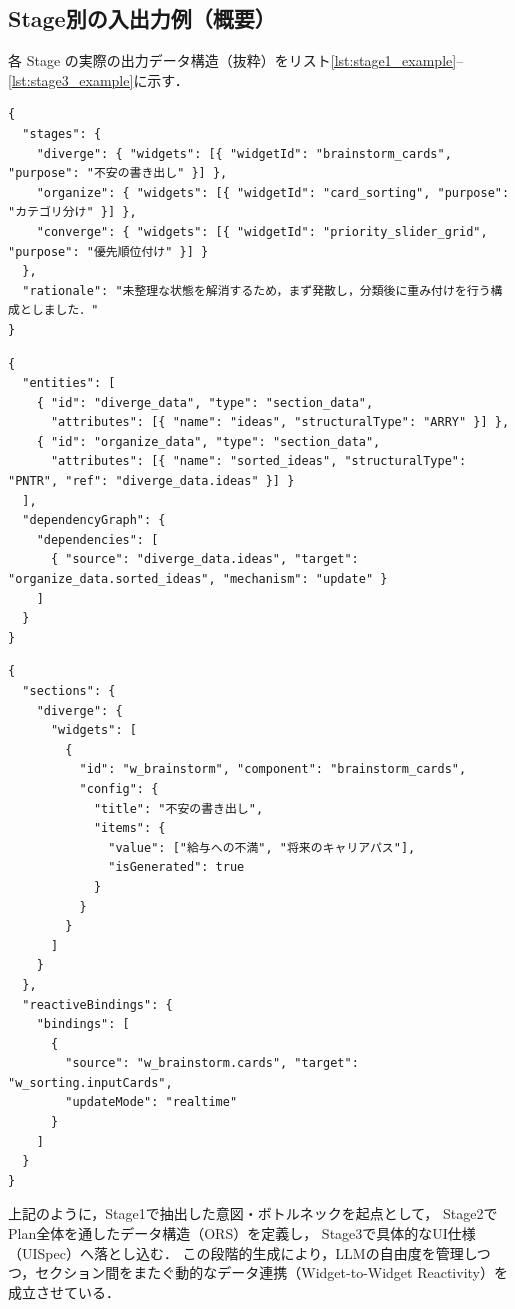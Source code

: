 \documentclass[senior,final,11pt,dvipdfmx]{iputit-thesis}
\begin{document}
\subsection{Stage別の入出力例（概要）}
各 Stage の実際の出力データ構造（抜粋）をリスト\ref{lst:stage1_example}--\ref{lst:stage3_example}に示す．

\begin{lstlisting}[caption = Stage1出力例：WidgetSelectionResult（JSON）, label = lst:stage1_example]
{
  "stages": {
    "diverge": { "widgets": [{ "widgetId": "brainstorm_cards", "purpose": "不安の書き出し" }] },
    "organize": { "widgets": [{ "widgetId": "card_sorting", "purpose": "カテゴリ分け" }] },
    "converge": { "widgets": [{ "widgetId": "priority_slider_grid", "purpose": "優先順位付け" }] }
  },
  "rationale": "未整理な状態を解消するため，まず発散し，分類後に重み付けを行う構成としました．"
}
\end{lstlisting}

\begin{lstlisting}[caption = Stage2出力例：Integrated ORS（JSON）, label = lst:stage2_example]
{
  "entities": [
    { "id": "diverge_data", "type": "section_data", 
      "attributes": [{ "name": "ideas", "structuralType": "ARRY" }] },
    { "id": "organize_data", "type": "section_data",
      "attributes": [{ "name": "sorted_ideas", "structuralType": "PNTR", "ref": "diverge_data.ideas" }] }
  ],
  "dependencyGraph": {
    "dependencies": [
      { "source": "diverge_data.ideas", "target": "organize_data.sorted_ideas", "mechanism": "update" }
    ]
  }
}
\end{lstlisting}

\begin{lstlisting}[caption = Stage3出力例：Integrated UISpec（JSON）, label = lst:stage3_example]
{
  "sections": {
    "diverge": {
      "widgets": [
        {
          "id": "w_brainstorm", "component": "brainstorm_cards",
          "config": {
            "title": "不安の書き出し",
            "items": { 
              "value": ["給与への不満", "将来のキャリアパス"],
              "isGenerated": true
            }
          }
        }
      ]
    }
  },
  "reactiveBindings": {
    "bindings": [
      {
        "source": "w_brainstorm.cards", "target": "w_sorting.inputCards",
        "updateMode": "realtime"
      }
    ]
  }
}
\end{lstlisting}

上記のように，Stage1で抽出した意図・ボトルネックを起点として，
Stage2でPlan全体を通したデータ構造（ORS）を定義し，
Stage3で具体的なUI仕様（UISpec）へ落とし込む．
この段階的生成により，LLMの自由度を管理しつつ，セクション間をまたぐ動的なデータ連携（Widget-to-Widget Reactivity）を成立させている．
\end{document}
